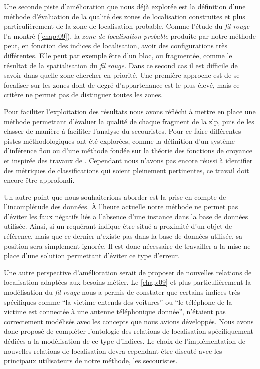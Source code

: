 Une seconde piste d'amélioration que nous déjà explorée est la
définition d'une méthode d'évaluation de la qualité des zones de
localisation construites et plus particulièrement de la zone de
localisation probable. Comme l'étude du \emph{fil rouge} l'a montré
(\autoref{chap:09}), la \emph{zone de localisation probable} produite
par notre méthode peut, en fonction des indices de localisation, avoir
des configurations très différentes. Elle peut par exemple être d'un
bloc, ou fragmentée, comme le résultat de la spatialisation du
\emph{fil rouge.} Dans ce second cas il est difficile de savoir dans
quelle zone chercher en priorité. Une première approche est de se
focaliser sur les zones dont de degré d'appartenance est le plus
élevé, mais ce critère ne permet pas de distinguer toutes les
zones.

Pour faciliter l'exploitation des résultats nous avons réfléchi à
mettre en place une méthode permettant d'évaluer la qualité de chaque
fragment de la \ac{zlp}, puis de les classer de manière à faciliter
l'analyse du secouristes. Pour ce faire différentes pistes
méthodologiques ont été explorées, comme la définition d'un système
d'inférence flou ou d'une méthode fondée sur la théorie des fonctions
de croyance \autocite{Shafer1976} et inspirée des travaux de
\textcite{Olteanu2008}. Cependant nous n'avons pas encore réussi à
identifier des métriques de classifications qui soient pleinement
pertinentes, ce travail doit encore être approfondi.

Un autre point que nous souhaiterions aborder est la prise en compte
de l'incomplétude des données. À l'heure actuelle notre méthode ne
permet pas d'éviter les faux négatifs liés a l'absence d'une instance
dans la base de données utilisée. Ainsi, si un requérant indique être
situé a proximité d'un objet de référence, mais que ce dernier
n'existe pas dans la base de données utilisée, sa position sera
simplement ignorée. Il est donc nécessaire de travailler a la mise ne
place d'une solution permettant d'éviter ce type d'erreur. 

Une autre perspective d'amélioration serait de proposer de nouvelles
relations de localisation adaptées aux besoins métier. Le
\autoref{chap:09} et plus particulièrement la modélisation du
\emph{fil rouge} nous a permis de constater que certains indices très
spécifiques comme \enquote{la victime entends des voitures} ou
\enquote{le téléphone de la victime est connectée à une antenne
  téléphonique donnée}, n'étaient pas correctement modélisés avec les
concepts que nous avions développés. Nous avons donc proposé de
compléter l'ontologie des relations de localisation spécifiquement
dédiées a la modélisation de ce type d'indices. Le choix de
l'implémentation de nouvelles relations de localisation devra
cependant être discuté avec les principaux utilisateurs de notre
méthode, les secouristes.

